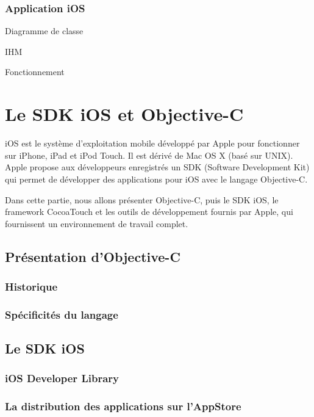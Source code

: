 \documentclass[11pt, french]{report}
\begin{document}
\subsection{Application iOS}

Diagramme de classe

IHM

Fonctionnement 


\chapter{Le SDK iOS et Objective-C}

iOS est le système d’exploitation mobile développé par Apple pour fonctionner sur iPhone, iPad et iPod Touch. Il est dérivé de Mac OS X (basé sur UNIX). Apple propose aux développeurs enregistrés un SDK (Software Development Kit) qui permet de développer des applications pour iOS avec le langage Objective-C.

Dans cette partie, nous allons présenter Objective-C, puis le SDK iOS, le framework CocoaTouch et les outils de développement fournis par Apple, qui fournissent un environnement de travail complet. 

\section{Présentation d'Objective-C}

\subsection{Historique}


\subsection{Spécificités du langage}


\section{Le SDK iOS}

\subsection{iOS Developer Library}


\subsection{La distribution des applications sur l’AppStore}
\end{document}
